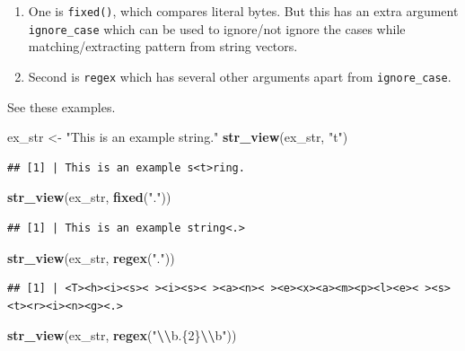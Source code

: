\documentclass[
]{book}
\newenvironment{Shaded}{\begin{snugshade}}{\end{snugshade}}
\newcommand{\FunctionTok}[1]{\textcolor[rgb]{0.13,0.29,0.53}{\textbf{#1}}}
\newcommand{\NormalTok}[1]{#1}
\newcommand{\OtherTok}[1]{\textcolor[rgb]{0.56,0.35,0.01}{#1}}
\newcommand{\SpecialCharTok}[1]{\textcolor[rgb]{0.81,0.36,0.00}{\textbf{#1}}}
\newcommand{\StringTok}[1]{\textcolor[rgb]{0.31,0.60,0.02}{#1}}
\providecommand{\tightlist}{%
  \setlength{\itemsep}{0pt}\setlength{\parskip}{0pt}}
\begin{document}
\begin{enumerate}
\def\labelenumi{\arabic{enumi}.}
\tightlist
\item
  One is \texttt{fixed()}, which compares literal bytes. But this has an extra argument \texttt{ignore\_case} which can be used to ignore/not ignore the cases while matching/extracting pattern from string vectors.
\item
  Second is \texttt{regex} which has several other arguments apart from \texttt{ignore\_case}.
\end{enumerate}

See these examples.

\begin{Shaded}
\begin{Highlighting}[]
\NormalTok{ex\_str }\OtherTok{\textless{}{-}} \StringTok{"This is an example string."}
\FunctionTok{str\_view}\NormalTok{(ex\_str, }\StringTok{"t"}\NormalTok{)}
\end{Highlighting}
\end{Shaded}

\begin{verbatim}
## [1] | This is an example s<t>ring.
\end{verbatim}

\begin{Shaded}
\begin{Highlighting}[]
\FunctionTok{str\_view}\NormalTok{(ex\_str, }\FunctionTok{fixed}\NormalTok{(}\StringTok{"."}\NormalTok{))}
\end{Highlighting}
\end{Shaded}

\begin{verbatim}
## [1] | This is an example string<.>
\end{verbatim}

\begin{Shaded}
\begin{Highlighting}[]
\FunctionTok{str\_view}\NormalTok{(ex\_str, }\FunctionTok{regex}\NormalTok{(}\StringTok{"."}\NormalTok{))}
\end{Highlighting}
\end{Shaded}

\begin{verbatim}
## [1] | <T><h><i><s>< ><i><s>< ><a><n>< ><e><x><a><m><p><l><e>< ><s><t><r><i><n><g><.>
\end{verbatim}

\begin{Shaded}
\begin{Highlighting}[]
\FunctionTok{str\_view}\NormalTok{(ex\_str, }\FunctionTok{regex}\NormalTok{(}\StringTok{"}\SpecialCharTok{\textbackslash{}\textbackslash{}}\StringTok{b.\{2\}}\SpecialCharTok{\textbackslash{}\textbackslash{}}\StringTok{b"}\NormalTok{))}
\end{Highlighting}
\end{Shaded}
\end{document}
